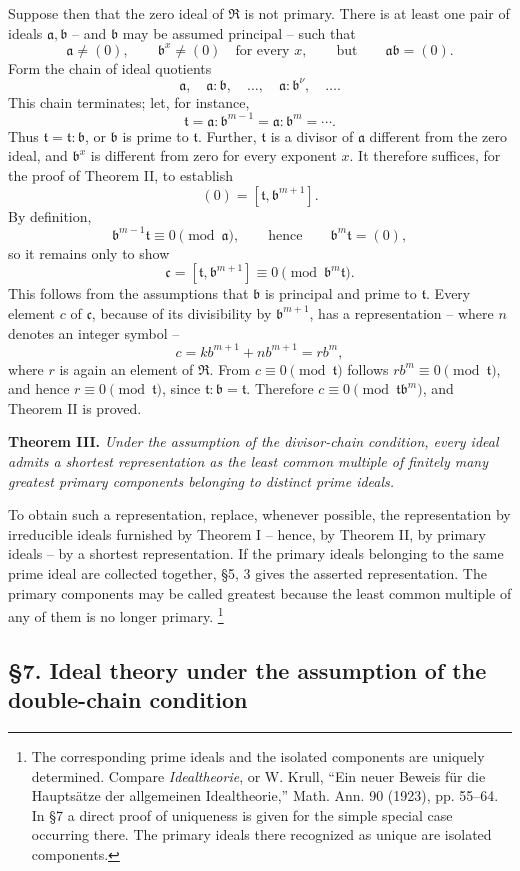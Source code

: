 \documentclass[11pt]{article}
\providecommand{\mR}{\mathfrak{R}}
\providecommand{\ma}{\mathfrak{a}}
\providecommand{\mb}{\mathfrak{b}}
\providecommand{\mc}{\mathfrak{c}}
\providecommand{\mt}{\mathfrak{t}}
\begin{document}
Suppose then that the zero ideal of $\mR$ is not primary. There is at least one pair of ideals $\ma,\mb$ -- and $\mb$ may be assumed principal -- such that
\[
\ma\ne(0),\qquad \mb^x\ne(0)\quad\text{for every }x,
\qquad\text{but}\qquad \ma\mb=(0).
\]
Form the chain of ideal quotients
\[
\ma,\quad \ma:\mb,\quad \ldots,\quad \ma:\mb^\nu,\quad\ldots .
\]
This chain terminates; let, for instance,
\[
\mt=\ma:\mb^{m-1}=\ma:\mb^m=\cdots .
\]
Thus $\mt=\mt:\mb$, or $\mb$ is prime to $\mt$. Further, $\mt$ is a divisor of $\ma$ different from the zero ideal, and $\mb^x$ is different from zero for every exponent $x$. It therefore suffices, for the proof of Theorem II, to establish
\[
        (0)=[\mt,\mb^{m+1}].
\]
By definition,
\[
        \mb^{m-1}\mt\equiv0\pmod{\ma},\qquad\text{hence}\qquad \mb^m\mt=(0),
\]
so it remains only to show
\[
        \mc=[\mt,\mb^{m+1}]\equiv0\pmod{\mb^m\mt}.
\]
This follows from the assumptions that $\mb$ is principal and prime to $\mt$. Every element $c$ of $\mc$, because of its divisibility by $\mb^{m+1}$, has a representation -- where $n$ denotes an integer symbol --
\[
        c=k b^{m+1}+n b^{m+1}=r b^m,
\]
where $r$ is again an element of $\mR$. From $c\equiv0\pmod{\mt}$ follows $r b^m\equiv0\pmod{\mt}$, and hence $r\equiv0\pmod{\mt}$, since $\mt:\mb=\mt$. Therefore $c\equiv0\pmod{\mt\mb^m}$, and Theorem II is proved.

\textbf{Theorem III.} \emph{Under the assumption of the divisor-chain condition, every ideal admits a shortest representation as the least common multiple of finitely many greatest primary components belonging to distinct prime ideals.}

To obtain such a representation, replace, whenever possible, the representation by irreducible ideals furnished by Theorem I -- hence, by Theorem II, by primary ideals -- by a shortest representation. If the primary ideals belonging to the same prime ideal are collected together, §5, 3 gives the asserted representation. The primary components may be called greatest because the least common multiple of any of them is no longer primary.
\footnote{The corresponding prime ideals and the isolated components are uniquely determined. Compare \emph{Idealtheorie}, or W. Krull, ``Ein neuer Beweis für die Hauptsätze der allgemeinen Idealtheorie,'' Math. Ann. 90 (1923), pp. 55--64. In §7 a direct proof of uniqueness is given for the simple special case occurring there. The primary ideals there recognized as unique are isolated components.}

\subsection*{§7. Ideal theory under the assumption of the double-chain condition}
\end{document}
